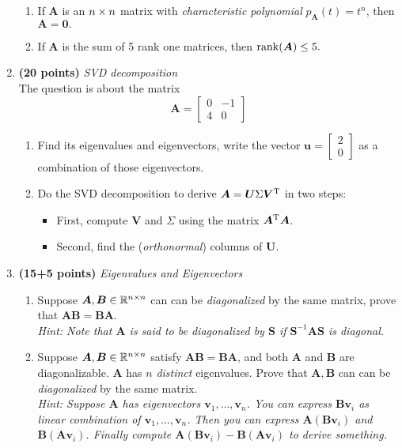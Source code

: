 \begin{enumerate}
\begin{enumerate}
\item
If $\bm A$ is an $n\times n$ matrix with \textit{characteristic polynomial} $p_{\bm A}(t)=t^n$, then $\bm A=\bm 0.$\\
\item
If $\bm A$ is the sum of 5 rank one matrices, then $\operatorname{rank}(\bm A)\le5.$
\end{enumerate}
\newpage
\item \textbf{(20 points)} \textit{SVD decomposition} \\
The question is about the matrix
\[
\bm A=\begin{bmatrix}
0&-1\\4&0
\end{bmatrix}
\]
\begin{enumerate}
\item
Find its eigenvalues and eigenvectors, write the vector $\bm u=\begin{bmatrix}
2\\0
\end{bmatrix}$ as a combination of those eigenvectors.\\
\item
Do the SVD decomposition to derive $\bm A=\bm U\Sigma\bm V^{\mathrm T}$ in two steps:
\begin{itemize}
\item
First, compute $\bm V$ and $\Sigma$ using the matrix $\bm A^{\mathrm T}\bm A$.
\item
Second, find the (\textit{orthonormal}) columns of $\bm U$.
\end{itemize}
\end{enumerate}
\newpage
\item \textbf{(15+5 points)} \textit{Eigenvalues and Eigenvectors}\\
\begin{enumerate}
\item
Suppose $\bm A,\bm B\in\mathbb{R}^{n\times n}$ can can be \textit{diagonalized} by the same matrix, prove that $\bm{AB}=\bm{BA}.$\\
\textit{Hint: Note that $\bm A$ is said to be diagonalized by $\bm S$ if $\bm S^{-1}\bm A\bm S$ is diagonal.}\\
\item
Suppose $\bm A,\bm B\in\mathbb{R}^{n\times n}$ satisfy $\bm{AB}=\bm{BA}$, and both $\bm A$ and $\bm B$ are diagonalizable. $\bm A$ has $n$ \textit{distinct} eigenvalues. Prove that $\bm A,\bm B$ can can be \textit{diagonalized} by the same matrix.\\
\textit{Hint: Suppose $\bm A$ has eigenvectors $\bm v_1,\dots,\bm v_n$. You can express $\bm B\bm v_i$ as linear combination of $\bm v_1,\dots,\bm v_n$. Then you can express $\bm A(\bm B\bm v_i)$ and $\bm B(\bm A\bm v_i)$. Finally compute $\bm A(\bm B\bm v_i)-\bm B(\bm A\bm v_i)$ to derive something.}\\

\end{enumerate}
\end{enumerate}
